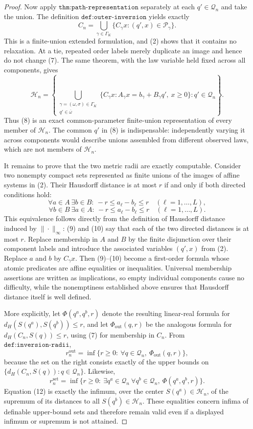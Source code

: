 \documentclass{article}
\begin{document}
\begin{proof}
Now apply \(\texttt{thm:path-representation}\) separately at each \(q'\in\mathcal Q_n\) and take the union.  The definition \(\texttt{def:outer-inversion}\) yields exactly
\[
 C_n
 =\bigcup_{\gamma\in\Gamma_K}
   \{C_\gamma x:(q',x)\in\mathcal P_\gamma\}.
 \tag{7}
\]
This is a finite-union extended formulation, and (2) shows that it contains no relaxation.  At a tie, repeated order labels merely duplicate an image and hence do not change (7).  The same theorem, with the law variable held fixed across all components, gives
\[
 \mathcal H_n
 =\left\{
   \bigcup_{\substack{\gamma=(\omega,\sigma)\in\Gamma_K\\q'\in\overline\omega}}
   \{C_\gamma x:A_\gamma x=b_\gamma+B_\gamma q',\ x\geq0\}
   :q'\in\mathcal Q_n
 \right\}.
 \tag{8}
\]
Thus (8) is an exact common-parameter finite-union representation of every member of \(\mathcal H_n\).  The common \(q'\) in (8) is indispensable: independently varying it across components would describe unions assembled from different observed laws, which are not members of \(\mathcal H_n\).

It remains to prove that the two metric radii are exactly computable.  Consider two nonempty compact sets represented as finite unions of the images of affine systems in (2).  Their Hausdorff distance is at most \(r\) if and only if both directed conditions hold:
\[
 \forall a\in A\ \exists b\in B:\ -r\leq a_\ell-b_\ell\leq r
       \quad(\ell=1,\ldots,L),
 \tag{9}
\]
\[
 \forall b\in B\ \exists a\in A:\ -r\leq a_\ell-b_\ell\leq r
       \quad(\ell=1,\ldots,L).
 \tag{10}
\]
This equivalence follows directly from the definition of Hausdorff distance induced by \(\|\cdot\|_\infty\): (9) and (10) say that each of the two directed distances is at most \(r\).  Replace membership in \(A\) and \(B\) by the finite disjunction over their component labels and introduce the associated variables \((q',x)\) from (2).  Replace \(a\) and \(b\) by \(C_\gamma x\).  Then (9)--(10) become a first-order formula whose atomic predicates are affine equalities or inequalities.  Universal membership assertions are written as implications, so empty individual components cause no difficulty, while the nonemptiness established above ensures that Hausdorff distance itself is well defined.

More explicitly, let \(\Phi(q^a,q^b,r)\) denote the resulting linear-real formula for
\(d_H(S(q^a),S(q^b))\leq r\), and let \(\Phi_{\mathrm{out}}(q,r)\) be the analogous formula for \(d_H(C_n,S(q))\leq r\), using (7) for membership in \(C_n\).  From \(\texttt{def:inversion-radii}\),
\[
 r_n^{\mathrm{out}}
 =\inf\{r\geq0:\ \forall q\in\mathcal Q_n,\ \Phi_{\mathrm{out}}(q,r)\},
 \tag{11}
\]
because the set on the right consists exactly of the upper bounds on
\(\{d_H(C_n,S(q)):q\in\mathcal Q_n\}\).  Likewise,
\[
 r_n^{\mathrm{set}}
 =\inf\{r\geq0:\ \exists q^a\in\mathcal Q_n\ \forall q^b\in\mathcal Q_n,
                      \ \Phi(q^a,q^b,r)\}.
 \tag{12}
\]
Equation (12) is exactly the infimum, over the center \(S(q^a)\in\mathcal H_n\), of the supremum of its distances to all \(S(q^b)\in\mathcal H_n\).  These equalities concern infima of definable upper-bound sets and therefore remain valid even if a displayed infimum or supremum is not attained.


\end{proof}
\end{document}
